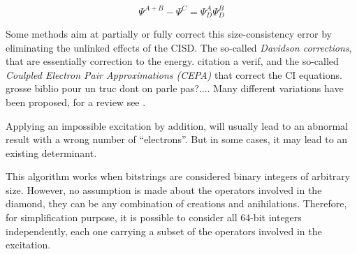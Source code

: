 \documentclass[./thesis.tex]{subfiles}
\begin{document}
\begin{equation}
\Psi^{A+B} - \Psi^C  = \Psi_{D}^A \Psi_{D}^B
\end{equation}

Some methods aim at partially or fully correct this size-consistency error by eliminating the unlinked effects of the CISD. The so-called \emph{Davidson corrections}, that are essentially correction to the energy\cite{Langhoff_1974}. \alert{citation a verif}, and the so-called \emph{Coulpled Electron Pair Approximations (CEPA)} that correct the CI equations\cite{Kelly_1963,Kelly_1964,Meyer_1971,Meyer_1973,Meyer_1974,Ahlrichs_1975}. \alert{grosse biblio pour un truc dont on parle pas?...}. Many different variations have been proposed, for a review see \cite{Koch_1981}.






\begin{algorithm}

\ForAll{$\kI$ with $EXC(\kI, \kalpha) \leq 4$}{

$\delta \gets -(I + \alpha)$ \;
$i \gets 1$ \;
$j \gets 1$ \;
\While{$j \leq N \wedge i \leq N$}{
	\uIf{$D_j - D_i > \delta$}{
		increment $i$ \;
	}
	\uElseIf{$D_j - D_i < \delta$}{
		increment $j$ \;
	}
	\Else
	{
		\tcc{$\hat T_{I \rightarrow D_j}$ is $D_j-I$}
		\tcc{$D_i + (D_j-I) = \alpha$}
		
		
		
		
		\tcc{\alert{check if addition applies correct excitaion}}
		\tcc{impossible exciation results in an abnormal number of modified spinorbitals}	
		\If{$||D_j \oplus I|| = ||D_i \oplus \alpha||$}{
			diamond found \;
		}
		increment $i$ and $j$ \;
	}
}
}
\end{algorithm}

Applying an impossible excitation by addition, will usually lead to an abnormal result with a wrong number of ``electrons''. But in some cases, it may lead to an existing determinant. 



This algorithm works when bitstrings are considered binary integers of arbitrary size. However, no assumption is made about the operators involved in the diamond, they can be any combination of creations and anihilations. Therefore, for simplification purpose, it is possible to consider all 64-bit integers independently, each one carrying a subset of the operators involved in the excitation.
\end{document}
